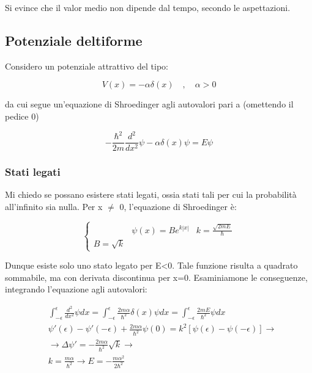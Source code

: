 \documentclass{article}
\begin{document}
Si evince che il valor medio non dipende dal tempo, secondo le aspettazioni.

\subsection{Potenziale deltiforme}

Considero un potenziale attrattivo del tipo:

\begin{equation}
    V(x)= -\alpha \delta(x) \quad , \quad \alpha>0
\end{equation}

da cui segue un'equazione di Shroedinger agli autovalori pari a (omettendo il pedice 0)

\begin{equation}
    -\frac{\hbar^2}{2m}\frac{d^2}{dx^2}\psi-\alpha \delta(x)\psi=E\psi
\end{equation}

\subsubsection[short]{Stati legati}
Mi chiedo se possano esistere stati legati, ossia stati tali per cui la probabilità all'infinito sia nulla.
Per x $\neq$ 0, l'equazione di Shroedinger è:

\begin{equation}
    \left\{
    \begin{aligned}
         & \psi(x)=Be^{k|x|}
         & k=\frac{\sqrt{2mE}}{\hbar}
        \\ B= \sqrt{k}
    \end{aligned}
    \right.
\end{equation}

Dunque esiste solo uno stato legato per E<0.
Tale funzione risulta a quadrato sommabile, ma con derivata discontinua per x=0. Esaminiamone le conseguenze, integrando
l'equazione agli autovalori:

\begin{equation}
    \begin{aligned}
         & \int_{-\epsilon}^{\epsilon} \frac{d^2}{dx^2} \psi dx = \int_{-\epsilon}^{\epsilon}\frac{2m\alpha}{\hbar^2}\delta(x)\psi dx= \int_{-\epsilon}^{\epsilon} \frac{2mE}{\hbar^2}\psi dx \\
         & \psi'(\epsilon)-\psi'(-\epsilon)+\frac{2m\alpha}{\hbar^2}\psi(0)=k^2[\psi(\epsilon)- \psi(-\epsilon)] \rightarrow                                                                  \\
         & \rightarrow \Delta \psi'= -\frac{2m\alpha}{\hbar^2}\sqrt{k} \rightarrow                                                                                                            \\
         & k= \frac{m\alpha}{\hbar^2} \rightarrow E=-\frac{m\alpha^2}{2\hbar^2}
    \end{aligned}
\end{equation}
\end{document}
